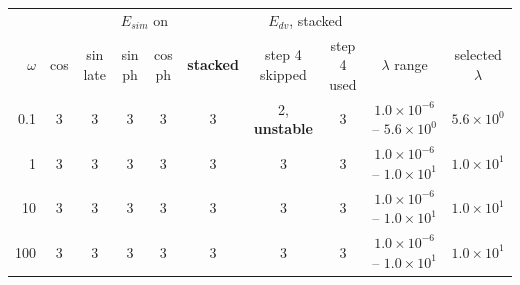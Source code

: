 \begin{tabular}{r|ccccc|cc|cc}\toprule
 & \multicolumn{5}{c|}{$E_{sim}$ on} & \multicolumn{2}{c|}{$E_{dv}$, stacked} & & \\
$\omega$ & cos & sin late & sin ph & cos ph & \textbf{stacked} & step 4 skipped & step 4 used & $\lambda$ range & selected $\lambda$\\\midrule
0.1 & 3 & 3 & 3 & 3 & 3 & 2, \textbf{unstable} & 3 & $1.0\!\times\!10^{-6}$ -- $5.6\!\times\!10^{0}$ & $5.6\!\times\!10^{0}$\\
1 & 3 & 3 & 3 & 3 & 3 & 3 & 3 & $1.0\!\times\!10^{-6}$ -- $1.0\!\times\!10^{1}$ & $1.0\!\times\!10^{1}$\\
10 & 3 & 3 & 3 & 3 & 3 & 3 & 3 & $1.0\!\times\!10^{-6}$ -- $1.0\!\times\!10^{1}$ & $1.0\!\times\!10^{1}$\\
100 & 3 & 3 & 3 & 3 & 3 & 3 & 3 & $1.0\!\times\!10^{-6}$ -- $1.0\!\times\!10^{1}$ & $1.0\!\times\!10^{1}$\\
\bottomrule\end{tabular}